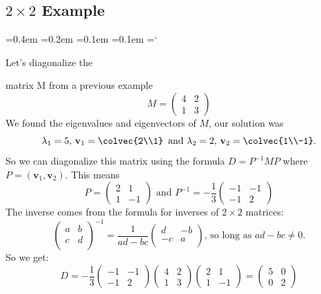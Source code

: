 
\subsection*{$2\times2$ Example}

{\ttfamily
{}\font=0.4em
\font=0.2em
\font=0.1em
\font=0.1em
\hyphenchar\font=`\-


\hypertarget{scripts_diagonalization_example}{Let's diagonalize the} matrix M from a previous example
\[
M = 
\begin{pmatrix}
4 & 2\\
1 &3 
\end{pmatrix}
\]
We found the eigenvalues and eigenvectors of $M$, our solution was \[
\lambda_1 = 5, \, \mathbf{v}_1= \colvec{2\\1} \, \text{ and } \lambda_2 = 2, \, \mathbf{v}_2=\colvec{1\\-1}.
\]
So we can diagonalize this matrix using the formula $D = P^{-1}MP$ where $P= (\mathbf{v}_1, \mathbf{v}_2)$. This means
\[
P = \begin{pmatrix}
2 &1\\
1 &-1 
\end{pmatrix}
\text{ and }
P^{-1} = -\frac{1}{3}\begin{pmatrix}
-1 &-1\\
-1 &2 
\end{pmatrix}
\]
The inverse comes from the formula for inverses of $2\times2$ matrices:
\[\begin{pmatrix}
a & b \\
c & d \\
\end{pmatrix}^{-1}=\frac{1}{ad-bc}\begin{pmatrix}
d & -b \\
-c & a \\
\end{pmatrix} \text{, so long as } ad-bc\neq 0.
\] So we get:
\[
D = -\frac{1}{3}\begin{pmatrix}
-1 &-1\\
-1 &2 
\end{pmatrix}
\begin{pmatrix}
4 & 2\\
1 &3 
\end{pmatrix}
 \begin{pmatrix}
2 &1\\
1 &-1 
\end{pmatrix}
=\begin{pmatrix}
5 &0\\
0 & 2
\end{pmatrix}
\]

}
